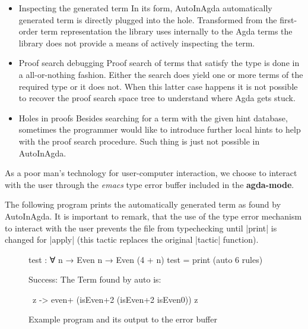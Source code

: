 \documentclass[a4paper]{article}
\begin{document}
\begin{itemize}
    \label {listing:usability}
    \item Inspecting the generated term
      In its form, AutoInAgda automatically generated term is directly plugged
      into the hole. Transformed from the first-order term representation the
      library uses internally to the Agda terms the library does not provide a
      means of actively inspecting the term.
    \item Proof search debugging
      Proof search of terms that satisfy the type is done in a all-or-nothing
      fashion. Either the search does yield one or more terms of the required
      type or it does not. When this latter case happens it is not possible to
      recover the proof search space tree to understand where Agda gets stuck.
    \item Holes in proofs
      Besides searching for a term with the given hint database, sometimes the
      programmer would like to introduce further local hints to help with the
      proof search procedure. Such thing is just not possible in AutoInAgda.
\end{itemize}

As a poor man's technology for user-computer interaction, we choose to interact
with the user through the \textit{emacs} type error buffer included in the 
\textbf{agda-mode}.

The following program prints the  automatically generated term as found by
AutoInAgda. It is important to remark, that the use of the type error mechanism
to interact with the user prevents the file from typechecking until |print| is
changed for |apply| (this tactic replaces the original |tactic| function).

\begin{figure}[h]
\noindent\begin{minipage}{.40\textwidth}
\scriptsize
\begin{code}
  test : ∀ {n} → Even n → Even (4 + n)
  test = print (auto 6 rules)
\end{code}
\end{minipage}
\begin{minipage}{.55\textwidth}
\scriptsize
\begin{code}
Success: The Term found by auto is:

\ z -> even+ (isEven+2 (isEven+2 isEven0)) z
\end{code}
\end{minipage}
  \caption{Example program and its output to the error buffer}
\end{figure}
\end{document}
